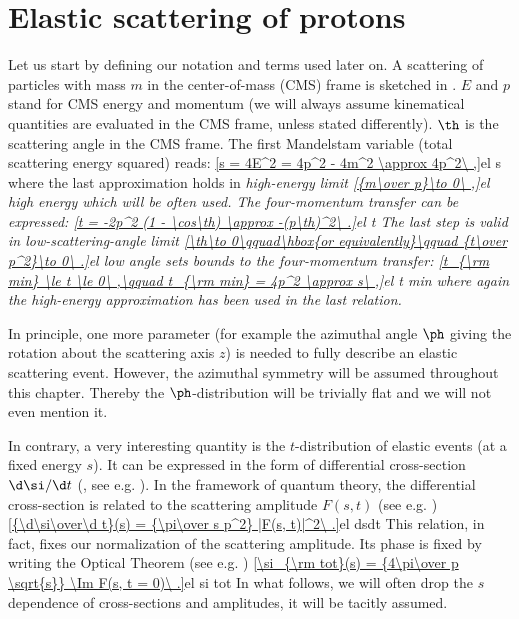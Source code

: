 \def\FC{F^{\rm C}}
\def\FH{F^{\rm H}}
\def\FCH{F^{\rm C+H}}
\def\e{{\rm e}}

\def\KL{Kudr\' at-Lokaj\' i\v cek}
\def\KaL{Kudr\' at and Lokaj\' i\v cek}
\def\WY{West-Yennie}
\def\WaY{West and Yennie}

\def\caption#1{%
	\vskip\baselineskip
	\em{#1}%
	\vskip\baselineskip
}

\chapter{Elastic scattering of protons}


Let us start by defining our notation and terms used later on. A scattering of particles with mass $m$ in the center-of-mass (CMS) frame is sketched in . $E$ and $p$ stand for CMS energy and momentum (we will always assume kinematical quantities are evaluated in the CMS frame, unless stated differently). $\th$ is the scattering angle in the CMS frame. The first Mandelstam variable (total scattering energy squared) reads:
\eqref{s = 4E^2 = 4p^2 - 4m^2 \approx 4p^2\ ,}{el s}
where the last approximation holds in \em{high-energy} limit
\eqref{{m\over p}\to 0\ ,}{el high energy}
which will be often used. The four-momentum transfer can be expressed:
\eqref{t = -2p^2 (1 - \cos\th) \approx -(p\th)^2\ .}{el t}
The last step is valid in \em{low-scattering-angle} limit
\eqref{\th\to 0\qquad\hbox{or equivalently}\qquad {t\over p^2}\to 0\ .}{el low angle}
 sets bounds to the four-momentum transfer:
\eqref{t_{\rm min} \le t \le 0\ ,\qquad t_{\rm min} = 4p^2 \approx s\ ,}{el t min}
where again the high-energy approximation has been used in the last relation.

In principle, one more parameter (for example the azimuthal angle $\ph$ giving the rotation about the scattering axis $z$) is needed to fully describe an elastic scattering event. However, the azimuthal symmetry will be assumed throughout this chapter. Thereby the $\ph$-distribution will be trivially flat and we will not even mention it.

In contrary, a very interesting quantity is the $t$-distribution of elastic events (at a fixed energy $s$). It can be expressed in the form of differential cross-section $\d\si/\d t$ (, see e.g. ). In the framework of quantum theory, the differential cross-section is related to the scattering amplitude $F(s, t)$ (see e.g. )
\eqref{{\d\si\over\d t}(s) = {\pi\over s p^2} |F(s, t)|^2\ .}{el dsdt}
This relation, in fact, fixes our normalization of the scattering amplitude. Its phase is fixed by writing the Optical Theorem (see e.g. )
\eqref{\si_{\rm tot}(s) = {4\pi\over p \sqrt{s}} \Im F(s, t = 0)\ .}{el si tot}
In what follows, we will often drop the $s$ dependence of cross-sections and amplitudes, it will be tacitly assumed.

